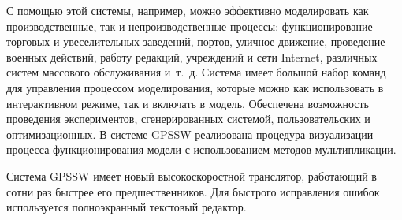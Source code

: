 С помощью этой системы, например, можно эффективно моделировать как производственные, так и непроизводственные процессы: функционирование торговых и увеселительных заведений, портов, уличное движение, проведение военных действий, работу редакций, учреждений и сети Internet, различных систем массового обслуживания и~т.~д. Система имеет большой набор команд для управления процессом моделирования, которые можно как использовать в интерактивном режиме, так и включать в модель. Обеспечена возможность проведения экспериментов, сгенерированных системой, пользовательских и оптимизационных. В системе GPSSW реализована процедура визуализации процесса функционирования модели с использованием методов мультипликации.

Система GPSSW имеет новый высокоскоростной транслятор, работающий в сотни раз быстрее его предшественников. Для быстрого исправления ошибок используется полноэкранный текстовый редактор.

